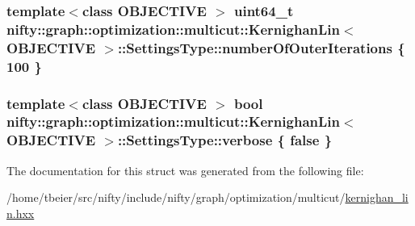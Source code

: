 \subsubsection[{number\+Of\+Outer\+Iterations}]{\setlength{\rightskip}{0pt plus 5cm}template$<$class O\+B\+J\+E\+C\+T\+I\+V\+E $>$ uint64\+\_\+t {\bf nifty\+::graph\+::optimization\+::multicut\+::\+Kernighan\+Lin}$<$ O\+B\+J\+E\+C\+T\+I\+V\+E $>$\+::Settings\+Type\+::number\+Of\+Outer\+Iterations \{ 100 \}}\label{structnifty_1_1graph_1_1optimization_1_1multicut_1_1KernighanLin_1_1SettingsType_af157041373b51ec37a22c0f40e650dbf}
\hypertarget{structnifty_1_1graph_1_1optimization_1_1multicut_1_1KernighanLin_1_1SettingsType_ade43b63e346f7e5bf84bc2a4e26fdc5a}{}
\subsubsection[{verbose}]{\setlength{\rightskip}{0pt plus 5cm}template$<$class O\+B\+J\+E\+C\+T\+I\+V\+E $>$ bool {\bf nifty\+::graph\+::optimization\+::multicut\+::\+Kernighan\+Lin}$<$ O\+B\+J\+E\+C\+T\+I\+V\+E $>$\+::Settings\+Type\+::verbose \{ false \}}\label{structnifty_1_1graph_1_1optimization_1_1multicut_1_1KernighanLin_1_1SettingsType_ade43b63e346f7e5bf84bc2a4e26fdc5a}


The documentation for this struct was generated from the following file\+:\begin{DoxyCompactItemize}
\item 
/home/tbeier/src/nifty/include/nifty/graph/optimization/multicut/\hyperlink{kernighan__lin_8hxx}{kernighan\+\_\+lin.\+hxx}\end{DoxyCompactItemize}
